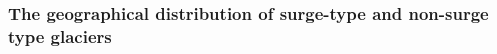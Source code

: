 \documentclass[draft,linenumbers]{agujournal}
\begin{document}


\subsubsection{The geographical distribution of surge-type and non-surge type glaciers}
\end{document}

